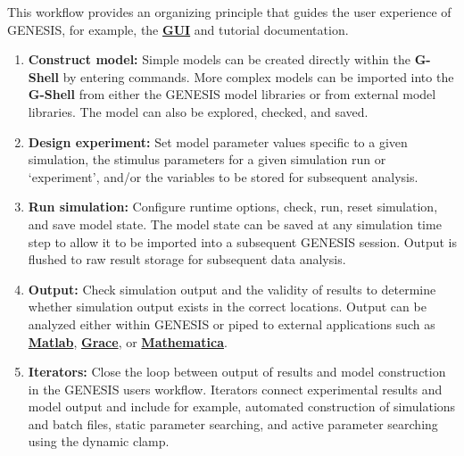 \documentclass[12pt]{article}
\begin{document}
This workflow provides an organizing principle that guides the user experience of GENESIS, for example, the \href{../gtube/gtube.tex}{\bf GUI} and tutorial documentation.

\begin{enumerate}

\item {\bf Construct model:} Simple models can be created directly within the {\bf G-Shell} by entering commands. More complex models can be imported into the {\bf G-Shell} from either the GENESIS model libraries or from external model libraries. The model can also be explored, checked, and saved.

\item {\bf Design experiment:}  Set model parameter values specific to a given simulation, the stimulus parameters for a given simulation run or  `experiment', and/or the variables to be stored for subsequent analysis.

\item  {\bf Run simulation:} Configure runtime options, check, run, reset simulation, and save model state. The model state can be saved at any simulation time step to allow it to be imported into a subsequent GENESIS session. Output is flushed to raw result storage for subsequent data analysis. 

\item {\bf Output:}  Check simulation output and the validity of results to determine whether simulation output exists in the correct locations. Output can be analyzed either within GENESIS or piped to external applications such as \href{http://www.mathworks.com/}{\bf Matlab}, \href{http://plasma-gate.weizmann.ac.il/Grace/}{\bf Grace}, or \href{http://www.wolfram.com/}{\bf Mathematica}.

\item {\bf Iterators:} Close the loop between output of results and model construction in the GENESIS users workflow. Iterators connect experimental results and model output and include for example, automated construction of simulations and batch files, static parameter searching, and active parameter searching using the dynamic clamp. 

\end{enumerate}
\end{document}
